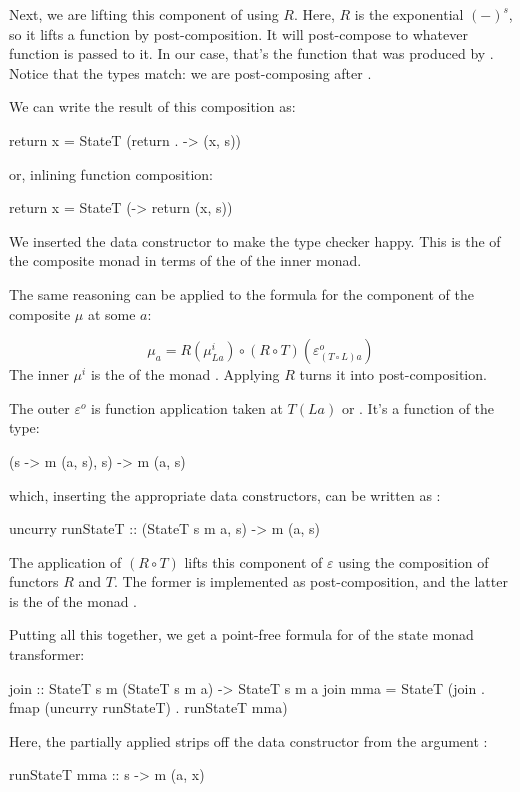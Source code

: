 \documentclass[DaoFP]{subfiles}
\begin{document}
Next, we are lifting this component of  using $R$. Here, $R$ is the exponential $(-)^s$, so it lifts a function by post-composition. It will post-compose  to whatever function is passed to it. In our case, that's the function that was produced by . Notice that the types match: we are post-composing  after . 

We can write the result of this composition as:
\begin{haskell}
return x = StateT (return . \s -> (x, s))
\end{haskell}
or, inlining function composition:
\begin{haskell}
return x = StateT (\s -> return (x, s))
\end{haskell}
We inserted the data constructor  to make the type checker happy. This is the  of the composite monad in terms of the  of the inner monad.

The same reasoning can be applied to the formula for the component of the composite $\mu$ at some $a$: 

\[ \mu_a = R(\mu^i_{L a}) \circ (R \circ T) (\varepsilon^o_{(T\circ L) a})\]
The inner $\mu^i$ is the  of the monad . Applying $R$ turns it into post-composition. 

The outer $\varepsilon^o$ is function application taken at $T(L a)$ or . It's a function of the type:
\begin{haskell}
(s -> m (a, s), s) -> m (a, s)
\end{haskell}
which, inserting the appropriate data constructors, can be written as :
\begin{haskell}
uncurry runStateT :: (StateT s m a, s) -> m (a, s)
\end{haskell}
The application of $(R \circ T)$ lifts this component of $\varepsilon$ using the composition of functors $R$ and $T$. The former is implemented as  post-composition, and the latter is the  of the monad . 

Putting all this together, we get a point-free formula for  of the state monad transformer:
\begin{haskell}
join :: StateT s m (StateT s m a) -> StateT s m a
join mma = StateT (join . fmap (uncurry runStateT) . runStateT mma)
\end{haskell}
Here, the partially applied  strips off the data constructor from the argument :
\begin{haskell}
runStateT mma :: s -> m (a, x)
\end{haskell}
\end{document}
